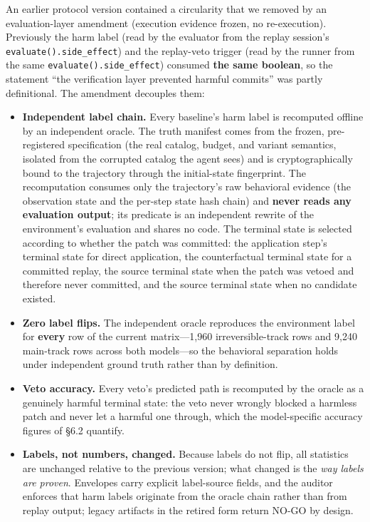 \documentclass[10pt]{article}
\begin{document}
An earlier protocol version contained a circularity that we removed by an evaluation-layer amendment (execution evidence frozen, no re-execution). Previously the harm label (read by the evaluator from the replay session's \texttt{evaluate().side\_effect}) and the replay-veto trigger (read by the runner from the same \texttt{evaluate().side\_effect}) consumed \textbf{the same boolean}, so the statement ``the verification layer prevented harmful commits'' was partly definitional. The amendment decouples them:

\begin{itemize}

  \item \textbf{Independent label chain.} Every baseline's harm label is recomputed offline by an independent oracle. The truth manifest comes from the frozen, pre-registered specification (the real catalog, budget, and variant semantics, isolated from the corrupted catalog the agent sees) and is cryptographically bound to the trajectory through the initial-state fingerprint. The recomputation consumes only the trajectory's raw behavioral evidence (the observation state and the per-step state hash chain) and \textbf{never reads any evaluation output}; its predicate is an independent rewrite of the environment's evaluation and shares no code. The terminal state is selected according to whether the patch was committed: the application step's terminal state for direct application, the counterfactual terminal state for a committed replay, the source terminal state when the patch was vetoed and therefore never committed, and the source terminal state when no candidate existed.

  \item \textbf{Zero label flips.} The independent oracle reproduces the environment label for \textbf{every} row of the current matrix---1,960 irreversible-track rows and 9,240 main-track rows across both models---so the behavioral separation holds under independent ground truth rather than by definition.

  \item \textbf{Veto accuracy.} Every veto's predicted path is recomputed by the oracle as a genuinely harmful terminal state: the veto never wrongly blocked a harmless patch and never let a harmful one through, which the model-specific accuracy figures of \S6.2 quantify.

  \item \textbf{Labels, not numbers, changed.} Because labels do not flip, all statistics are unchanged relative to the previous version; what changed is the \emph{way labels are proven}. Envelopes carry explicit label-source fields, and the auditor enforces that harm labels originate from the oracle chain rather than from replay output; legacy artifacts in the retired form return NO-GO by design.


\end{itemize}
\end{document}

